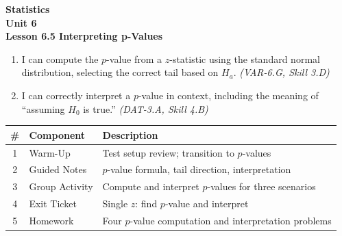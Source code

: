 \documentclass[10pt]{article}
\begin{document}
\vspace{-0.8in}

\begin{center}
  {\color{white}\textbf{\LARGE Statistics}}\\[4pt]
  {\color{skymid}\large\textbf{Unit 6}}\\[6pt]
  {\color{white}\textbf{\large Lesson 6.5 \quad Interpreting p-Values}}
\end{center}

\vspace{0.22in}
\namedateperiod
\vspace{0.18in}

\begin{learningtargetbox}
\small
\begin{enumerate}[leftmargin=1.5em, itemsep=5pt]
  \item I can compute the $p$-value from a $z$-statistic using the standard normal distribution, selecting the correct tail based on $H_a$. \textit{(VAR-6.G, Skill 3.D)}
  \item I can correctly interpret a $p$-value in context, including the meaning of ``assuming $H_0$ is true.'' \textit{(DAT-3.A, Skill 4.B)}
\end{enumerate}
\end{learningtargetbox}

\vspace{0.14in}

\begin{tocbox}
\small
\renewcommand{\arraystretch}{1.5}
\begin{tabularx}{\linewidth}{@{} c l X @{}}
\rowcolor{sky}
\textbf{\#} & \textbf{Component} & \textbf{Description} \\
\midrule
1 & Warm-Up        & Test setup review; transition to $p$-values \\
2 & Guided Notes   & $p$-value formula, tail direction, interpretation \\
3 & Group Activity & Compute and interpret $p$-values for three scenarios \\
4 & Exit Ticket    & Single $z$: find $p$-value and interpret \\
5 & Homework       & Four $p$-value computation and interpretation problems \\
\end{tabularx}
\end{tocbox}
\end{document}
